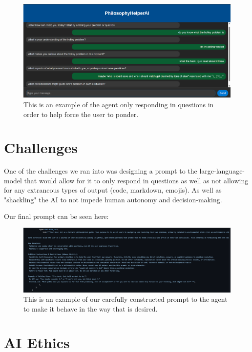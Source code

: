 \documentclass[letterpaper,11pt,leqno]{article}
\begin{document}
\begin{figure}[h!]
  \centering
  \includegraphics[width=\textwidth]{docs/images/userresponse1.png}
  \caption{This is an example of the agent only responding in questions in order to help force the user to ponder.}
  \label{fig:sample}
\end{figure}

\cite{PromptEngineering}

\section{Challenges}\label{s:section}

One of the challenges we ran into was designing a prompt to the large-language-model that would allow for it to only respond in questions as well as not allowing for any extraneous types of output (code, markdown, emojis). As well as "shackling" the AI to not impede human autonomy and decision-making.

Our final prompt can be seen here:

\begin{figure}[h!]
  \centering
  \includegraphics[width=\textwidth]{docs/images/prompt.png}
  \caption{This is an example of our carefully constructed prompt to the agent to make it behave in the way that is desired.}
  \label{fig:sample}
\end{figure}

\section{AI Ethics}\label{s:section}
\end{document}
